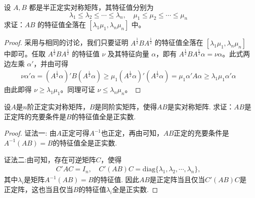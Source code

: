 \documentclass[../../main.tex]{subfiles}
\begin{document}
\begin{proposition}\label{proposition:例9.65}
设 \(A,B\) 都是半正定实对称矩阵，其特征值分别为
\[
\lambda_1 \leqslant  \lambda_2 \leqslant  \cdots \leqslant  \lambda_n,\quad \mu_1 \leqslant  \mu_2 \leqslant  \cdots \leqslant  \mu_n
\]
求证：\(AB\) 的特征值全落在 \([\lambda_1\mu_1,\lambda_n\mu_n]\) 中。
\end{proposition}
\begin{proof}
采用与相同的讨论，我们只要证明 \(A^{\frac{1}{2}}BA^{\frac{1}{2}}\) 的特征值全落在 \([\lambda_1\mu_1,\lambda_n\mu_n]\) 中即可。任取 \(A^{\frac{1}{2}}BA^{\frac{1}{2}}\) 的特征值 \(\nu\) 及其特征向量 \(\alpha\)，即有 \(A^{\frac{1}{2}}BA^{\frac{1}{2}}\alpha = \nu\alpha\)。此式两边左乘 \(\alpha'\)，并由可得
\begin{align*}
\nu\alpha'\alpha = (A^{\frac{1}{2}}\alpha)'B(A^{\frac{1}{2}}\alpha) \geqslant  \mu_1(A^{\frac{1}{2}}\alpha)'(A^{\frac{1}{2}}\alpha) = \mu_1\alpha'A\alpha \geqslant  \lambda_1\mu_1\alpha'\alpha
\end{align*}
由此即得 \(\nu \geqslant  \lambda_1\mu_1\)。同理可证 \(\nu \leqslant  \lambda_n\mu_n\)。

\end{proof}

\begin{proposition}\label{proposition:例9.66}
设\(A\)是\(n\)阶正定实对称矩阵，\(B\)是同阶实矩阵，使得\(AB\)是实对称矩阵. 求证：\(AB\)是正定阵的充要条件是\(B\)的特征值全是正实数.
\end{proposition}
\begin{proof}
{\color{blue}证法一:}
由\(A\)正定可得\(A^{-1}\)也正定，再由可知，\(AB\)正定的充要条件是\(A^{-1}(AB) = B\)的特征值全是正实数.

{\color{blue}证法二:}由可知，存在可逆矩阵\(C\)，使得
\begin{align*}
C'AC = I_n,\quad C'(AB)C = \mathrm{diag}\{\lambda_1,\lambda_2,\cdots,\lambda_n\},
\end{align*}
其中\(\lambda_i\)是矩阵\(A^{-1}(AB)=B\)的特征值. 因此\(AB\)是正定阵当且仅当\(C'(AB)C\)是正定阵，这也当且仅当\(B\)的特征值\(\lambda_i\)全是正实数.

\end{proof}
\end{document}

